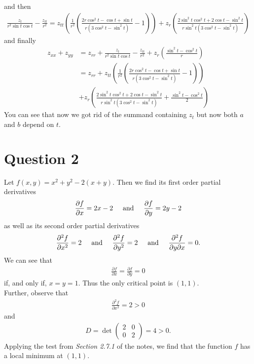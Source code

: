 \documentclass{article}
\newcommand{\p}{\partial }
\begin{document}
and then
\begin{align*}
  \frac{z_t}{r^2\sin t\cos t} - \frac{z_{tt}}{r^2}=
  z_{tt}\left(\frac{1}{r^2}\left(\frac{2r\cos^2 t - \cos t + \sin t}{r(3\cos^2 t - \sin^2 t)}-1\right)\right)
  +z_{r}\left(\frac{2\sin^2 t\cos^2 t+2\cos t-\sin^2 t}{r\sin^2 t\left(3\cos^2 t - \sin^2 t\right)}\right)
\end{align*}
and finally
\begin{align*}
  z_{xx}+z_{yy} &= z_{rr}+\frac{z_t}{r^2\sin t\cos t} - \frac{z_{tt}}{r^2}+ z_r\left(\frac{\sin^2 t - \cos^2 t}{r}\right)\\
  &=z_{rr}+z_{tt}\left(\frac{1}{r^2}\left(\frac{2r\cos^2 t - \cos t + \sin t}{r(3\cos^2 t - \sin^2 t)}-1\right)\right)\\
  &+z_r\left(\frac{2\sin^2 t\cos^2 t+2\cos t-\sin^2 t}{r\sin^2 t\left(3\cos^2 t - \sin^2 t\right)}+\frac{\sin^2 t - \cos^2 t}{2} \right)
\end{align*}
You can see that now we got rid of the summand containing $z_t$ but now both $a$ and $b$ depend on $t$.
\pagebreak
\section*{Question 2}
Let $f(x,y)=x^2+y^2-2(x+y)$. Then we find its first order partial derivatives
\begin{align*}
  \frac{\p f}{\p x}=2x-2 \text{\hspace{0.5cm}and\hspace{0.5cm}}
  \frac{\p f}{\p y}=2y-2
\end{align*}
as well as its second order partial derivatives
\begin{align*}
  \frac{\p^2 f}{\p x^2}=2\text{\hspace{0.5cm}and\hspace{0.5cm}}
  \frac{\p^2 f}{\p y^2}=2\text{\hspace{0.5cm}and\hspace{0.5cm}}
  \frac{\p^2 f}{\p y\p x}=0.
\end{align*}
We can see that
\begin{align*}
  \frac{\p f}{\p x} = \frac{\p f}{\p y} = 0
\end{align*}
if, and only if, $x=y=1$. Thus the only critical point is $(1,1)$.\\
Further, observe that
\begin{align*}
  \frac{\p^2 f}{\p x^2}=2>0
\end{align*}
and
\begin{align*}
  D = \det \begin{pmatrix}
    2 & 0\\
    0 & 2
  \end{pmatrix}
  = 4 > 0.
\end{align*}
Applying the test from \emph{Section 2.7.1} of the notes, we find 
that the function $f$ has a local minimum at $(1,1)$.
\end{document}
